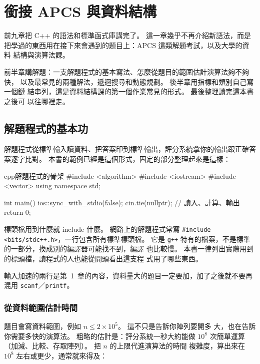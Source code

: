 \chapter{銜接 APCS 與資料結構}
\label{ch:bridge}

前九章把 C++ 的語法和標準函式庫講完了。 這一章幾乎不再介紹新語法，而是
把學過的東西用在接下來會遇到的題目上：APCS 這類解題考試，以及大學的資料
結構與演算法課。

前半章講解題：一支解題程式的基本寫法、怎麼從題目的範圍估計演算法夠不夠快，
以及最常見的兩種解法，遞迴搜尋和動態規劃。 後半章用指標和類別自己寫一個鏈
結串列，這是資料結構課的第一個作業常見的形式。 最後整理讀完這本書之後可
以往哪裡走。

\section{解題程式的基本功}
\label{sec:contest-basics}

解題程式從標準輸入讀資料、把答案印到標準輸出，評分系統拿你的輸出跟正確答
案逐字比對。 本書的範例已經是這個形式，固定的部分整理起來是這樣：

\begin{code}{cpp}{解題程式的骨架}
#include <algorithm>
#include <iostream>
#include <vector>
using namespace std;

int main() {
    ios::sync_with_stdio(false);
    cin.tie(nullptr);
    // 讀入、計算、輸出
    return 0;
}
\end{code}

標頭檔用到什麼就 include 什麼。 網路上的解題程式常寫
\texttt{\#include <bits/stdc++.h>}，一行包含所有標準標頭檔。 它是
\texttt{g++} 特有的檔案，不是標準的一部分，換成別的編譯器可能找不到，編譯
也比較慢。 本書一律列出實際用到的標頭檔，讀程式的人也能從開頭看出這支程
式用了哪些東西。

輸入加速的兩行是第~1~章的內容，資料量大的題目一定要加，加了之後就不要再
混用 \texttt{scanf}／\texttt{printf}。

\subsection{從資料範圍估計時間}

題目會寫資料範圍，例如 $n \le 2 \times 10^5$。 這不只是告訴你陣列要開多
大，也在告訴你需要多快的演算法。 粗略的估計是：評分系統一秒大約能做
$10^8$ 次簡單運算（加減、比較、存取陣列）。 把 $n$ 的上限代進演算法的時間
複雜度，算出來在 $10^8$ 左右或更少，通常就來得及：

